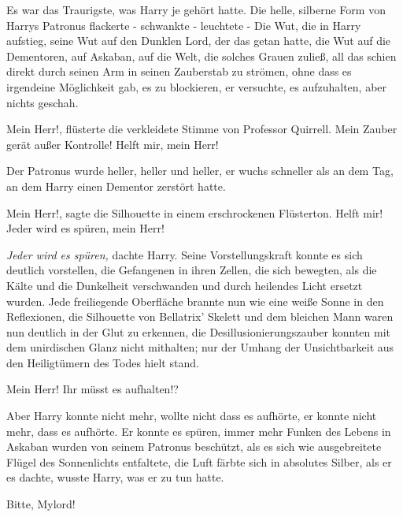 Es war das Traurigste, was Harry je gehört hatte. Die helle, silberne Form von
Harrys Patronus flackerte - schwankte - leuchtete - Die Wut, die in Harry
aufstieg, seine Wut auf den Dunklen Lord, der das getan hatte, die Wut auf die
Dementoren, auf Askaban, auf die Welt, die solches Grauen zuließ, all das schien
direkt durch seinen Arm in seinen Zauberstab zu strömen, ohne dass es irgendeine
Möglichkeit gab, es zu blockieren, er versuchte, es aufzuhalten, aber nichts
geschah.

\glqq{}Mein Herr!\grqq{}, flüsterte die verkleidete Stimme von Professor
Quirrell. \glqq{}Mein Zauber gerät außer Kontrolle! Helft mir, mein Herr!\grqq{}

Der Patronus wurde heller, heller und heller, er wuchs schneller als an dem Tag,
an dem Harry einen Dementor zerstört hatte.

\glqq{}Mein Herr!\grqq{}, sagte die Silhouette in einem erschrockenen Flüsterton.
\glqq{}Helft mir! Jeder wird es spüren, mein Herr!\grqq{}

\emph{Jeder wird es spüren,} dachte Harry. Seine Vorstellungskraft konnte es
sich deutlich vorstellen, die Gefangenen in ihren Zellen, die sich bewegten, als
die Kälte und die Dunkelheit verschwanden und durch heilendes Licht ersetzt
wurden. Jede freiliegende Oberfläche brannte nun wie eine weiße Sonne in den
Reflexionen, die Silhouette von Bellatrix' Skelett und dem bleichen Mann waren
nun deutlich in der Glut zu erkennen, die Desillusionierungszauber konnten mit
dem unirdischen Glanz nicht mithalten; nur der Umhang der Unsichtbarkeit aus den
Heiligtümern des Todes hielt stand.

\glqq{}Mein Herr! Ihr müsst es aufhalten!?\grqq{}

Aber Harry konnte nicht mehr, wollte nicht dass es aufhörte, er konnte nicht
mehr, dass es aufhörte. Er konnte es spüren, immer mehr Funken des Lebens in
Askaban wurden von seinem Patronus beschützt, als es sich wie ausgebreitete
Flügel des Sonnenlichts entfaltete, die Luft färbte sich in absolutes Silber,
als er es dachte, wusste Harry, was er zu tun hatte.

\glqq{}Bitte, Mylord!\grqq{}

